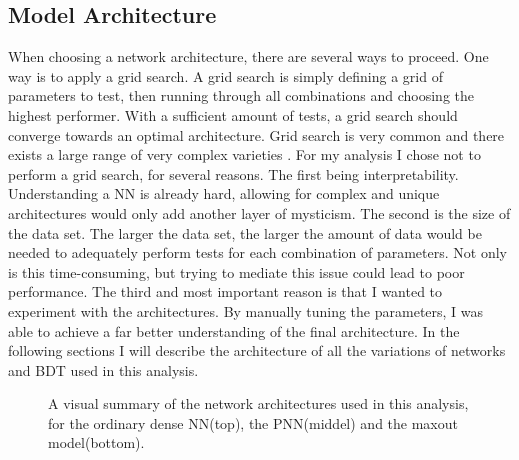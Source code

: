 \subsection{Model Architecture}\label{subsec:arch}
When choosing a network architecture, there are several ways to proceed. One way is to apply a grid search.
A grid search is simply defining a grid of parameters to test, then running through all combinations and 
choosing the highest performer. With a sufficient amount of tests, a grid search should converge towards 
an optimal architecture. Grid search is very common and there exists a large range of very complex varieties \cite{GS}.
For my analysis I chose not to perform a grid search, for several reasons. The first being interpretability.
Understanding a \ac{NN} is already hard, allowing for complex and unique architectures would only add another layer
of mysticism. The second is the size of the data set. The larger the data set, the larger the amount of data 
would be needed to adequately perform tests for each combination of parameters. Not only is this time-consuming,
but trying to mediate this issue could lead to poor performance. The third and most important reason is that 
I wanted to experiment with the architectures. By manually tuning the parameters, I was able to achieve a far 
better understanding of the final architecture. In the following sections I will describe the architecture of all the 
variations of networks and \ac{BDT} used in this analysis.
\begin{figure}
    \caption{A visual summary of the network architectures used in this analysis, for the ordinary dense \ac{NN}(top), the \ac{PNN}(middel)
    and the maxout model(bottom).}
    \label{fig:arch}
\end{figure}
